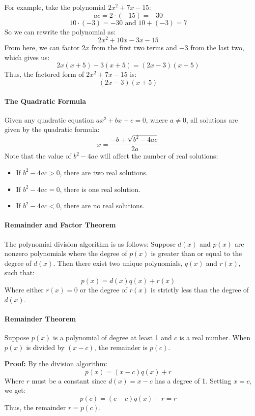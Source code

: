 For example, take the polynomial $2x^2 + 7x - 15$:
$$
ac = 2 \cdot (-15) = -30
$$
$$
10 \cdot (-3) = -30 \text{ and } 10 + (-3) = 7
$$
So we can rewrite the polynomial as:
$$
2x^2 + 10x - 3x - 15
$$
From here, we can factor $2x$ from the first two terms and $-3$ from the last two, which gives us:
$$
2x(x + 5) - 3(x + 5) = (2x - 3)(x + 5)
$$
Thus, the factored form of $2x^2 + 7x - 15$ is:
$$
(2x - 3)(x + 5)
$$
\paragraph{The Quadratic Formula}

Given any quadratic equation $ax^2 + bx + c = 0$, where $a \neq 0$, all solutions are given by the quadratic formula:
$$
x = \frac{-b \pm \sqrt{b^2 - 4ac}}{2a}
$$
Note that the value of $b^2 - 4ac$ will affect the number of real solutions:

\begin{itemize}
    \item If $b^2 - 4ac > 0$, there are two real solutions.
    \item If $b^2 - 4ac = 0$, there is one real solution.
    \item If $b^2 - 4ac < 0$, there are no real solutions.
\end{itemize}

\paragraph{Remainder and Factor Theorem}

The polynomial division algorithm is as follows: Suppose $d(x)$ and $p(x)$ are nonzero polynomials where the degree of $p(x)$ is greater than or equal to the degree of $d(x)$. Then there exist two unique polynomials, $q(x)$ and $r(x)$, such that:
$$
p(x) = d(x)q(x) + r(x)
$$
Where either $r(x) = 0$ or the degree of $r(x)$ is strictly less than the degree of $d(x)$.

\paragraph{Remainder Theorem}

Suppose $p(x)$ is a polynomial of degree at least 1 and $c$ is a real number. When $p(x)$ is divided by $(x - c)$, the remainder is $p(c)$.

\textbf{Proof:} By the division algorithm:
$$
p(x) = (x - c)q(x) + r
$$
Where $r$ must be a constant since $d(x) = x - c$ has a degree of 1. Setting $x = c$, we get:
$$
p(c) = (c - c)q(x) + r = r
$$
Thus, the remainder $r = p(c)$.

